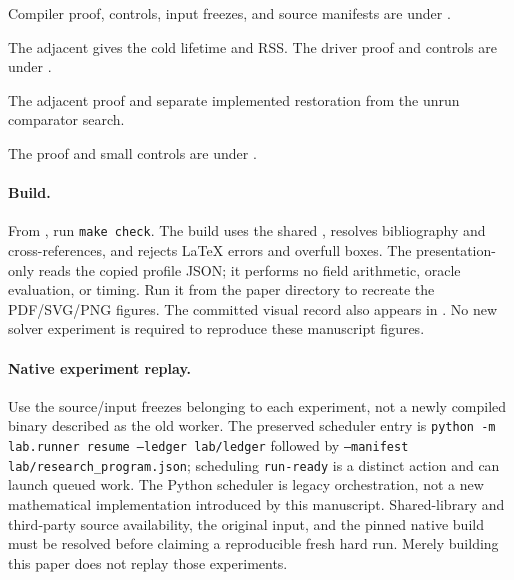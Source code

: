 Compiler proof, controls, input freezes, and source manifests are under
.

The adjacent  gives the cold lifetime and RSS.
The driver proof and controls are under
.

The adjacent proof and  separate implemented
restoration from the unrun comparator search.

The proof and small controls are under
.


\paragraph{Build.}
From , run \texttt{make check}.
The build uses the shared , resolves bibliography and
cross-references, and rejects LaTeX errors and overfull boxes.
The presentation-only  reads the copied
profile JSON; it performs no field arithmetic, oracle evaluation, or timing.
Run it from the paper directory to recreate the PDF/SVG/PNG figures.
The committed visual record also appears in
.
No new solver experiment is required to reproduce these manuscript figures.

\paragraph{Native experiment replay.}
Use the source/input freezes belonging to each experiment, not a newly
compiled binary described as the old worker. The preserved scheduler entry is
\texttt{python -m lab.runner resume --ledger lab/ledger}
followed by \texttt{--manifest lab/research\_program.json}; scheduling
\texttt{run-ready} is a distinct action and can launch queued work.
The Python scheduler is legacy orchestration, not a new mathematical
implementation introduced by this manuscript. Shared-library and third-party
source availability, the original input, and the pinned native build must be
resolved before claiming a reproducible fresh hard run. Merely building this
paper does not replay those experiments.

